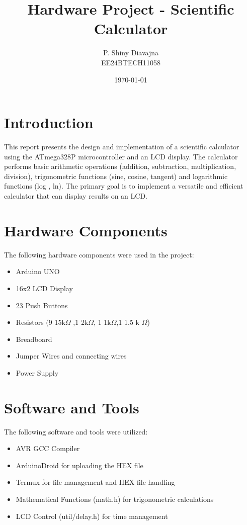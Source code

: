 \documentclass{article}
\title{\textbf{Hardware Project - Scientific Calculator}}
\author{P. Shiny Diavajna\\EE24BTECH11058}
\date{\today}
\begin{document}
\maketitle

\section{Introduction}
This report presents the design and implementation of a scientific calculator using the ATmega328P microcontroller and an LCD display. The calculator performs basic arithmetic operations (addition, subtraction, multiplication, division), trigonometric functions (sine, cosine, tangent) and logarithmic functions (log , ln). The primary goal is to implement a versatile and efficient calculator that can display results on an LCD.

\section{Hardware Components}
The following hardware components were used in the project:
\begin{itemize}
    \item Arduino UNO
    \item 16x2 LCD Display
    \item 23 Push Buttons
    \item Resistors (9 15k$\Omega$ ,1 2k$\Omega$, 1 1k$\Omega$,1 1.5 k $\Omega$)
    \item Breadboard
    \item Jumper Wires and connecting wires 
    \item Power Supply 
\end{itemize}

\section{Software and Tools}
The following software and tools were utilized:
\begin{itemize}
    \item AVR GCC Compiler
    \item ArduinoDroid for uploading the HEX file
    \item Termux for file management and HEX file handling
    \item Mathematical Functions (math.h) for trigonometric calculations
    \item LCD Control (util/delay.h) for time management
\end{itemize}
\end{document}
